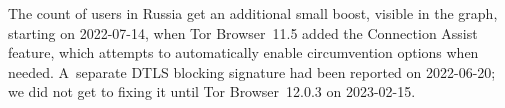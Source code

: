 \documentclass[letterpaper,twocolumn]{article}
\begin{document}
The count of users in Russia get an additional small boost,
visible in the graph,
starting on \mbox{2022-07-14},
when Tor Browser~11.5 added the Connection Assist feature,
which attempts to automatically enable circumvention options when needed.
A~separate DTLS blocking signature had been reported on \mbox{2022-06-20};
we did not get to fixing it until Tor Browser~12.0.3 on \mbox{2023-02-15}.
\end{document}
